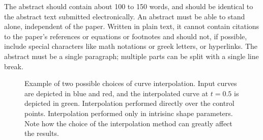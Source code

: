 \documentclass{ipol}
\newcommand{\chapFiveDir}{images/chapter_05a}
\begin{document}
	
	
	
	
	\begin{ipolAbstract}
		The abstract should contain about 100 to 150 words, and should be
		identical to the abstract text submitted electronically. An abstract
		must be able to stand alone, independent of the paper.  Written in
		plain text, it cannot contain citations to the paper’s references or
		equations or footnotes and should not, if possible, include special
		characters like math notations or greek letters, or hyperlinks. The
		abstract must be a single paragraph; multiple parts can be split with
		a single line break.
	\end{ipolAbstract}
%
\vspace{-36pt}
\begin{figure}[h]
	\centering
	\caption{Example of two possible choices of curve interpolation. Input curves are depicted in blue and red, and the interpolated curve at $t=0.5$ is depicted in green. \protect{} Interpolation performed directly over the control points. \protect{} Interpolation performed only in intrisinc shape parameters. Note how the choice of the interpolation method can greatly affect the results.}
	\label{fig:image_interpolation:curve_interpolation:example}
\end{figure}
%
\end{document}
